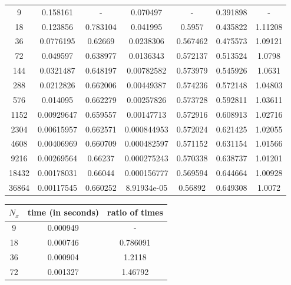 \documentclass{article} %
\theoremstyle{plain}
\numberwithin{equation}{section} %
\numberwithin{figure}{section} %
\numberwithin{table}{section} %
\begin{document}
\begin{enumerate}[\ \ (a)]
\begin{table}[ht!]
\begin{tabular}{||c|c|c||c|c||c|c||}
                \hline
                 9 & 0.158161   & -        & 0.070497    & -        & 0.391898 & -       \\
                18 & 0.123856   & 0.783104 & 0.041995    & 0.5957   & 0.435822 & 1.11208 \\
                36 & 0.0776195  & 0.62669  & 0.0238306   & 0.567462 & 0.475573 & 1.09121 \\
                72 & 0.049597   & 0.638977 & 0.0136343   & 0.572137 & 0.513524 & 1.0798  \\
               144 & 0.0321487  & 0.648197 & 0.00782582  & 0.573979 & 0.545926 & 1.0631  \\
               288 & 0.0212826  & 0.662006 & 0.00449387  & 0.574236 & 0.572148 & 1.04803 \\
               576 & 0.014095   & 0.662279 & 0.00257826  & 0.573728 & 0.592811 & 1.03611 \\
              1152 & 0.00929647 & 0.659557 & 0.00147713  & 0.572916 & 0.608913 & 1.02716 \\
              2304 & 0.00615957 & 0.662571 & 0.000844953 & 0.572024 & 0.621425 & 1.02055 \\
              4608 & 0.00406969 & 0.660709 & 0.000482597 & 0.571152 & 0.631154 & 1.01566 \\
              9216 & 0.00269564 & 0.66237  & 0.000275243 & 0.570338 & 0.638737 & 1.01201 \\
             18432 & 0.00178031 & 0.66044  & 0.000156777 & 0.569594 & 0.644664 & 1.00928 \\
             36864 & 0.00117545 & 0.660252 & 8.91934e-05 & 0.56892  & 0.649308 & 1.0072  \\
            \hline\hline
            \end{tabular}
        \end{table}
        \vspace{-0.25cm}
        \begin{table}[ht!]
            \centering
            \begin{tabular}{||c|c|c||}\hline\hline
               $N_x$ &   time (in seconds) &   ratio of times \\
            \hline
                 9 &            0.000949 &         -        \\
                18 &            0.000746 &         0.786091 \\
                36 &            0.000904 &         1.2118   \\
                72 &            0.001327 &         1.46792  \\

\end{tabular}
\end{table}
\end{enumerate}
\end{document}
